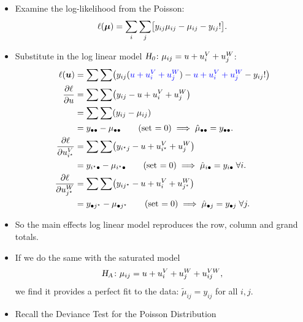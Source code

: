 \documentclass[oneside]{book}\usepackage[]{graphicx}\usepackage[svgnames]{xcolor}
\let\exp\relax%
\let\log\relax%
\newcommand{\HN}{\textsl{H}_{\textsl{0}}}%
\newcommand{\HA}{\textsl{H}_{\textsl{A}}}%
\providecommand{\Vector}[1]{\bm{#1}}%
\begin{document}
\begin{itemize}
    \item Examine the log-likelihood from the Poisson:
          \[ \ell(\Vector{\mu})=\sum_i\sum_j\bigl[y_{ij}\log{\mu_{ij}}-\mu_{ij}-\log{y_{ij}!}\bigr]. \]
    \item Substitute in the log linear model \textcolor{Blue}{$ \HN\colon \log{\mu_{ij}}=u+u_i^V+u_j^W $}:
          \begin{align*}
              \ell(\Vector{u})
                            & =\sum\sum\bigl(y_{ij}(\textcolor{Blue}{u+u_i^V+u_j^W})-\exp{\textcolor{Blue}{u+u_i^V+u_j^W}}-\log{y_{ij}!}\bigr)          \\
              \pdv{\ell}{u} & =\sum\sum\bigl(y_{ij}-\exp{u+u_i^V+u_j^W}\bigr)                                                                           \\
                            & =\sum\sum(y_{ij}-\mu_{ij})                                                                                                \\
                            & =y_{\bullet\bullet}-\mu_{\bullet\bullet}\qquad \text{(set $=0$)}\implies \hat{\mu}_{\bullet\bullet}=y_{\bullet\bullet}.   \\
              \pdv{\ell}{u_{i^\star}^V}
                            & =\sum\sum\bigl(y_{i^\star j}-\exp{u+u_{i^\star}^V+u_j^W}\bigr)                                                            \\
                            & =y_{i^\star\bullet}-\mu_{i^\star\bullet}\qquad \text{(set $=0$)}\implies\hat{\mu}_{i\bullet}=y_{i\bullet}\;\forall i.     \\
              \pdv{\ell}{u_{j^\star}^W}
                            & =\sum\sum\bigl(y_{ij^\star}-\exp{u+u_{i}^V+u_{j^\star}^W}\bigr)                                                           \\
                            & =y_{\bullet j^\star}-\mu_{\bullet j^\star}\qquad \text{(set $=0$)}\implies\hat{\mu}_{\bullet j}=y_{\bullet j}\;\forall j.
          \end{align*}
    \item So the main effects log linear model reproduces the row, column and grand totals.
    \item If we do the same with the saturated model
          \[ \HA\colon\log{\mu_{ij}}=u+u_i^V+u_j^W+u_{ij}^{VW}, \]
          we find it provides a perfect fit to the data: $ \tilde{\mu}_{ij}=y_{ij} $ for all $ i,j $.
    \item Recall the Deviance Test for the Poisson Distribution

\end{itemize}
\end{document}
